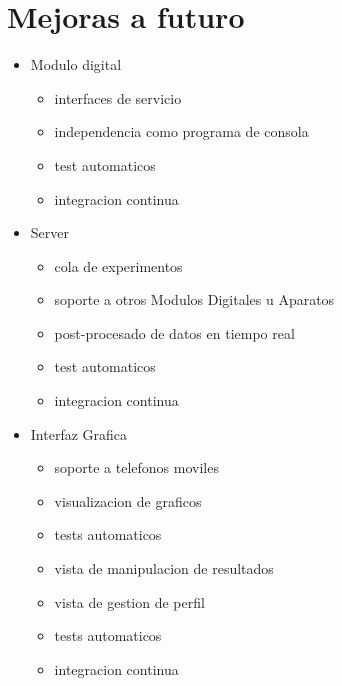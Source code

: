 \section{Mejoras a futuro}

\begin{itemize}

\item Modulo digital
    \begin{itemize}
    \item interfaces de servicio
    \item independencia como programa de consola
    \item test automaticos
    \item integracion continua
    \end{itemize}
\item Server
    \begin{itemize}
    \item cola de experimentos
    \item soporte a otros Modulos Digitales u Aparatos
    \item post-procesado de datos en tiempo real
    \item test automaticos
    \item integracion continua
    \end{itemize}
\item Interfaz Grafica
    \begin{itemize}
    \item soporte a telefonos moviles
    \item visualizacion de graficos
    \item tests automaticos
    \item vista de manipulacion de resultados
    \item vista de gestion de perfil
    \item tests automaticos
    \item integracion continua
    \end{itemize}
\end{itemize}
\newpage